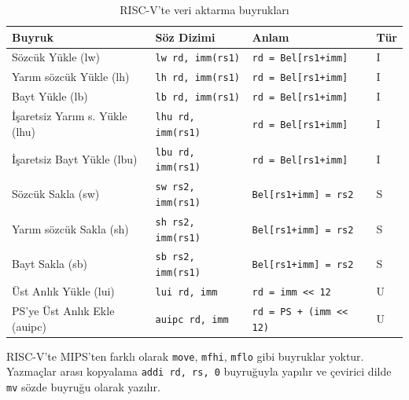 \begin{table}[H]
\centering
\caption{RISC-V'te veri aktarma buyrukları}
\label{tab:veri-aktarma}
\small
\begin{tabular}{llll}
\toprule
\textbf{Buyruk} & \textbf{Söz Dizimi} & \textbf{Anlam} & \textbf{Tür} \\
\midrule
Sözcük Yükle (lw)          & \texttt{lw rd, imm(rs1)}    & \texttt{rd = Bel[rs1+imm]}   & I \\
Yarım sözcük Yükle (lh)    & \texttt{lh rd, imm(rs1)}    & \texttt{rd = Bel[rs1+imm]}   & I \\
Bayt Yükle (lb)             & \texttt{lb rd, imm(rs1)}    & \texttt{rd = Bel[rs1+imm]}   & I \\
İşaretsiz Yarım s. Yükle (lhu) & \texttt{lhu rd, imm(rs1)} & \texttt{rd = Bel[rs1+imm]}  & I \\
İşaretsiz Bayt Yükle (lbu) & \texttt{lbu rd, imm(rs1)}   & \texttt{rd = Bel[rs1+imm]}   & I \\
Sözcük Sakla (sw)           & \texttt{sw rs2, imm(rs1)}   & \texttt{Bel[rs1+imm] = rs2}  & S \\
Yarım sözcük Sakla (sh)    & \texttt{sh rs2, imm(rs1)}   & \texttt{Bel[rs1+imm] = rs2}  & S \\
Bayt Sakla (sb)             & \texttt{sb rs2, imm(rs1)}   & \texttt{Bel[rs1+imm] = rs2}  & S \\
Üst Anlık Yükle (lui)       & \texttt{lui rd, imm}        & \texttt{rd = imm << 12}      & U \\
PS'ye Üst Anlık Ekle (auipc) & \texttt{auipc rd, imm}    & \texttt{rd = PS + (imm << 12)} & U \\
\bottomrule
\end{tabular}
\end{table}

RISC-V'te MIPS'ten farklı olarak \texttt{move}, \texttt{mfhi}, \texttt{mflo} gibi buyruklar yoktur. Yazmaçlar arası kopyalama \texttt{addi rd, rs, 0} buyruğuyla yapılır ve çevirici dilde \texttt{mv} sözde buyruğu olarak yazılır.

